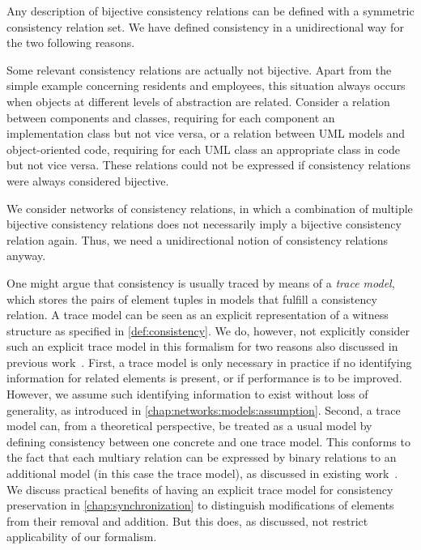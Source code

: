 Any description of bijective consistency relations can be defined with a symmetric consistency relation set.
We have defined consistency in a unidirectional way for the two following reasons.
\begin{longenumerate}
    \item Some relevant consistency relations are actually not bijective. 
    Apart from the simple example concerning residents and employees, this situation always occurs when objects at different levels of abstraction are related.
    Consider a relation between components and classes, requiring for each component an implementation class but not vice versa, or a relation between \gls{UML} models and object-oriented code, requiring for each \gls{UML} class an appropriate class in code but not vice versa.
    These relations could not be expressed if consistency relations were always considered bijective.
    \item We consider networks of consistency relations, in which a combination of multiple bijective consistency relations does not necessarily imply a bijective consistency relation again. 
    Thus, we need a unidirectional notion of consistency relations anyway.
\end{longenumerate}

One might argue that consistency is usually traced by means of a \emph{trace model}, which stores the pairs of element tuples in models that fulfill a consistency relation.
A trace model can be seen as an explicit representation of a witness structure as specified in \autoref{def:consistency}.
We do, however, not explicitly consider such an explicit trace model in this formalism for two reasons also discussed in previous work~.
First, a trace model is only necessary in practice if no identifying information for related elements is present, or if performance is to be improved.
However, we assume such identifying information to exist without loss of generality, as introduced in \autoref{chap:networks:models:assumption}.
Second, a trace model can, from a theoretical perspective, be treated as a usual model by defining consistency between one concrete and one trace model. This conforms to the fact that each multiary relation can be expressed by binary relations to an additional model (in this case the trace model), as discussed in existing work~\cite{stevens2020BidirectionalTransformationLarge-SoSym, cleve2019dagstuhl}.
We discuss practical benefits of having an explicit trace model for consistency preservation in \autoref{chap:synchronization} to distinguish modifications of elements from their removal and addition.
But this does, as discussed, not restrict applicability of our formalism.



